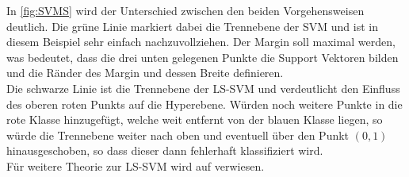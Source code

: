 In \autoref{fig:SVMS} wird der Unterschied zwischen den beiden Vorgehensweisen deutlich. Die grüne Linie markiert dabei die Trennebene der SVM und ist in diesem Beispiel sehr einfach nachzuvollziehen. Der Margin soll maximal werden, was bedeutet, dass die drei unten gelegenen Punkte die Support Vektoren bilden und die Ränder des Margin und dessen Breite definieren.\\
Die schwarze Linie ist die Trennebene der LS-SVM und verdeutlicht den Einfluss des oberen roten Punkts auf die Hyperebene. Würden noch weitere Punkte in die rote Klasse hinzugefügt, welche weit entfernt von der blauen Klasse liegen, so würde die Trennebene weiter nach oben und eventuell über den Punkt \(\left(0,1\right)\) hinausgeschoben, so dass dieser dann fehlerhaft klassifiziert wird.\\ 
Für weitere Theorie zur LS-SVM wird auf \cite{LS-SVM_b} verwiesen.